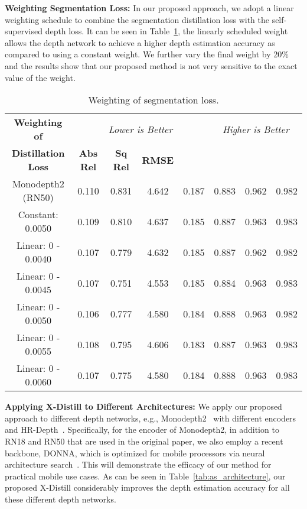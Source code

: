 \documentclass{bmvc2k}
\newcommand{\rev}{}
\begin{document}
\noindent \textbf{Weighting Segmentation Loss:} In our proposed approach, we adopt a linear weighting schedule to combine the segmentation distillation loss with the self-supervised depth loss. It can be seen in Table~\ref{tab:as_weights}, the linearly scheduled weight allows the depth network to achieve a higher depth estimation accuracy as compared to using a constant weight. We further vary the final weight by 20\% and the results show that our proposed method is not very sensitive to the exact value of the weight.
\begin{table}[h!]
\vspace{-5pt}
\centering
\scriptsize
\begin{tabular}[h]{ c | c  c  c  c | c  c  c}
\hline
{\textbf{Weighting of}} &\multicolumn{4}{c|}{\it Lower is Better} &\multicolumn{3}{c}{\it Higher is Better} \\
{\textbf{Distillation Loss}} &{\bf Abs Rel} &{\bf Sq Rel} &{\bf RMSE} &{\bf } &{\bf} &{\bf} &{\bf} 	\\
\hline
Monodepth2 (RN50)    &0.110 &0.831 &4.642 &0.187 &0.883 &0.962 &0.982 \\
\hdashline
Constant: 0.0050    &0.109 &0.810 &4.637 &0.185 &0.887 &0.963 &0.983 \\
Linear: 0 - 0.0040  &0.107 &0.779 &4.632 &0.185 &0.887 &0.962 &0.982 \\
Linear: 0 - 0.0045  &0.107 &0.751 &4.553 &0.185 &0.884 &0.963 &0.983 \\
Linear: 0 - 0.0050  &0.106 &0.777 &4.580 &0.184 &0.888 &0.963 &0.982 \\
Linear: 0 - 0.0055  &0.108 &0.795 &4.606 &0.183 &0.887 &0.963 &0.983 \\
Linear: 0 - 0.0060  &0.107 &0.775 &4.580 &0.184 &0.888 &0.963 &0.983 \\
\hline
\end{tabular}
\vspace{3pt}
\caption{\small Weighting of segmentation loss.}
\label{tab:as_weights}
\vspace{-5pt}
\end{table}

\vspace{1pt}
\noindent \textbf{Applying X-Distill to Different Architectures:}  \rev{We apply our proposed approach to different depth networks, e.g., Monodepth2~\cite{godard2019digging} with different encoders and HR-Depth~\cite{lyu2020hr}. Specifically, for the encoder of Monodepth2, in addition to RN18 and RN50 that are used in the original paper, we also employ a recent backbone, DONNA, which is optimized for mobile processors via neural architecture search~\cite{moons2021distilling}. This will demonstrate the efficacy of our method for practical mobile use cases. As can be seen in Table~\ref{tab:as_architecture}, our proposed X-Distill considerably improves the depth estimation accuracy for all these different depth networks.}
\end{document}

